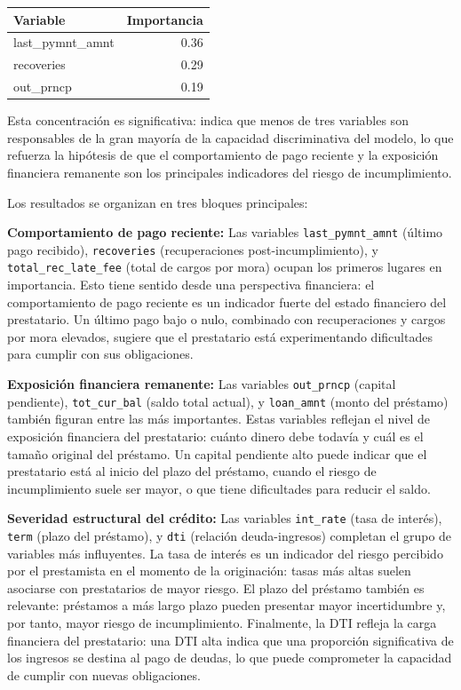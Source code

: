 \documentclass[12pt,a4paper]{article}
\begin{document}
\begin{center}
\begin{tabular}{lr}
\toprule
Variable & Importancia \\
\midrule
last\_pymnt\_amnt & 0.36 \\
recoveries        & 0.29 \\
out\_prncp        & 0.19 \\
\bottomrule
\end{tabular}
\end{center}

Esta concentración es significativa: indica que menos de tres variables son responsables de la gran mayoría de la capacidad discriminativa del modelo, lo que refuerza la hipótesis de que el comportamiento de pago reciente y la exposición financiera remanente son los principales indicadores del riesgo de incumplimiento.

Los resultados se organizan en tres bloques principales:

\textbf{Comportamiento de pago reciente:} Las variables \texttt{last\_pymnt\_amnt} (último pago recibido), \texttt{recoveries} (recuperaciones post-incumplimiento), y \texttt{total\_rec\_late\_fee} (total de cargos por mora) ocupan los primeros lugares en importancia. Esto tiene sentido desde una perspectiva financiera: el comportamiento de pago reciente es un indicador fuerte del estado financiero del prestatario. Un último pago bajo o nulo, combinado con recuperaciones y cargos por mora elevados, sugiere que el prestatario está experimentando dificultades para cumplir con sus obligaciones.

\textbf{Exposición financiera remanente:} Las variables \texttt{out\_prncp} (capital pendiente), \texttt{tot\_cur\_bal} (saldo total actual), y \texttt{loan\_amnt} (monto del préstamo) también figuran entre las más importantes. Estas variables reflejan el nivel de exposición financiera del prestatario: cuánto dinero debe todavía y cuál es el tamaño original del préstamo. Un capital pendiente alto puede indicar que el prestatario está al inicio del plazo del préstamo, cuando el riesgo de incumplimiento suele ser mayor, o que tiene dificultades para reducir el saldo.

\textbf{Severidad estructural del crédito:} Las variables \texttt{int\_rate} (tasa de interés), \texttt{term} (plazo del préstamo), y \texttt{dti} (relación deuda-ingresos) completan el grupo de variables más influyentes. La tasa de interés es un indicador del riesgo percibido por el prestamista en el momento de la originación: tasas más altas suelen asociarse con prestatarios de mayor riesgo. El plazo del préstamo también es relevante: préstamos a más largo plazo pueden presentar mayor incertidumbre y, por tanto, mayor riesgo de incumplimiento. Finalmente, la DTI refleja la carga financiera del prestatario: una DTI alta indica que una proporción significativa de los ingresos se destina al pago de deudas, lo que puede comprometer la capacidad de cumplir con nuevas obligaciones.
\end{document}
